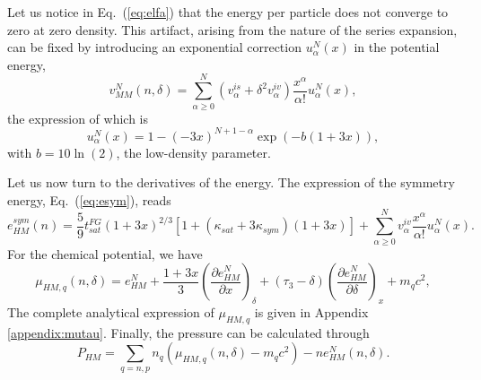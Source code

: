 Let us notice in Eq.~(\ref{eq:elfa}) that the energy per particle does not 
converge to zero at zero density. This artifact, arising from the nature of the 
series expansion, can be fixed by introducing an exponential correction 
$u^N_\alpha(x)$ in the potential energy, 
%
\begin{equation}
  v_{MM}^N(n,\delta) = \sum_{\alpha \geq 0}^N(v_\alpha^{is} +
  \delta^2v_\alpha^{iv})\frac{x^\alpha}{\alpha!}u_\alpha^N(x),\label{eq:mm}
\end{equation}
% 
the expression of which is
%
\begin{equation}
  u_\alpha^N(x) = 1 - (-3x)^{N+1-\alpha}\exp(-b(1+3x)),\label{eq:corr}
\end{equation}
%
with $b=10\ln(2)$, the low-density parameter.

Let us now turn to the derivatives of the energy. The expression of the 
symmetry energy, Eq.~(\ref{eq:esym}), reads
%
\begin{equation}
  e_{HM}^{sym}(n) =
  \frac{5}{9}t_{sat}^{FG}(1+3x)^{2/3}
  \left[1+(\kappa_{sat}+3\kappa_{sym})(1+3x)\right] + \sum_{\alpha \geq 0}^N
  v_{\alpha}^{iv}\frac{x^{\alpha}}{\alpha!}u_{\alpha}^N(x).\label{eq:esym_exp}
\end{equation}
%
For the chemical potential, we have
%
\begin{equation}
  \mu_{HM,q}(n,\delta) = e_{HM}^N 
  + \frac{1+3x}{3}\left(\frac{\partial e_{HM}^N}{\partial x}\right)_{\delta}
  + (\tau_3 - \delta)\left(\frac{\partial e_{HM}^N}{\partial \delta}\right)_{x} 
  + m_{q} c^2,\label{eq:chempot}
\end{equation}
%
The complete analytical expression of $\mu_{HM,q}$ is given in Appendix 
\ref{appendix:mutau}. Finally, the pressure can be calculated through
%
\begin{equation}
  P_{HM} = \sum_{q=n,p}n_{q}(\mu_{HM,q}(n,\delta) - m_{q}c^2) 
  - ne_{HM}^N(n,\delta).\label{eq:phm}
\end{equation}
%

